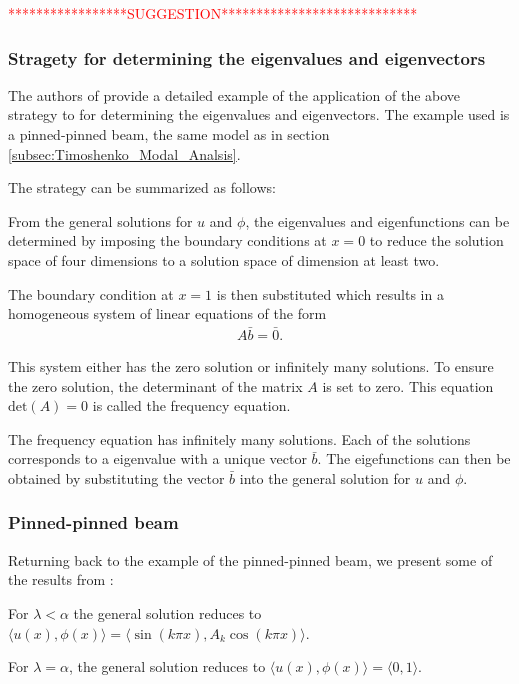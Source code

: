 \documentclass[../../main.tex]{subfiles}
\begin{document}
\textcolor{red}{*****************SUGGESTION****************************}

\subsubsection*{Stragety for determining the eigenvalues and eigenvectors}

The authors of \cite{VV06} provide a detailed example of the application of the above strategy to for determining the eigenvalues and eigenvectors. The example used is a pinned-pinned beam, the same model as in section \ref{subsec:Timoshenko_Modal_Analsis}.

The strategy can be summarized as follows:

From the general solutions for $u$ and $\phi$, the eigenvalues and eigenfunctions can be determined by imposing the boundary conditions at $x=0$ to reduce the solution space of four dimensions to a solution space of dimension at least two. 

The boundary condition at $x=1$ is then substituted which results in a homogeneous system of linear equations of the form
\begin{eqnarray*}
A \bar{b} = \bar{0}.
\end{eqnarray*} 

This system either has the zero solution or infinitely many solutions. To ensure the zero solution, the determinant of the matrix $A$ is set to zero. This equation $\textrm{det}(A) = 0$ is called the frequency equation.

The frequency equation has infinitely many solutions. Each of the solutions corresponds to a eigenvalue with a unique vector $\bar{b}$. The eigefunctions can then be obtained by substituting the vector $\bar{b}$ into the general solution for $u$ and $\phi$.

\subsubsection*{Pinned-pinned beam}

Returning back to the example of the pinned-pinned beam, we present some of the results from \cite{VV06}:

For $\lambda < \alpha$ the general solution reduces to $\langle u(x) , \phi(x) \rangle = \langle \sin(k \pi x), A_k \cos(k \pi x) \rangle$. 

For $\lambda = \alpha$, the general solution reduces to $\langle u(x) , \phi(x) \rangle = \langle 0, 1 \rangle$.
\end{document}
